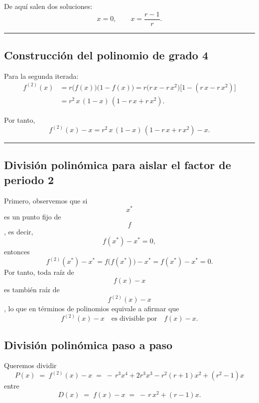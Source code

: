 \documentclass[
  11pt,
  a4paper,
  DIV=11,
  numbers=noendperiod]{scrreprt}
\begin{document}
De aquí salen dos soluciones:\\
\[
x = 0,
\qquad
x = \frac{r-1}{r}.
\]

\begin{center}\rule{0.5\linewidth}{0.5pt}\end{center}

\subsection{Construcción del polinomio de grado
4}\label{construcciuxf3n-del-polinomio-de-grado-4}

Para la segunda iterada:\\
\[
\begin{aligned}
f^{(2)}(x)
&= r\bigl(f(x)\bigr)\bigl(1 - f(x)\bigr)
= r\bigl(r\,x - r\,x^2\bigr)\bigl[1 - (r\,x - r\,x^2)\bigr]\\[6pt]
&= r^2\,x\,(1 - x)\,(1 - r\,x + r\,x^2).
\end{aligned}
\]

Por tanto,\\
\[
f^{(2)}(x) - x
= r^2\,x\,(1 - x)\,(1 - r\,x + r\,x^2) - x.
\]

\begin{center}\rule{0.5\linewidth}{0.5pt}\end{center}

\subsection{División polinómica para aislar el factor de periodo
2}\label{divisiuxf3n-polinuxf3mica-para-aislar-el-factor-de-periodo-2}

Primero, observemos que si \[x^*\] es un punto fijo de \[f\], es decir,
\[
f(x^*) - x^* = 0,
\] entonces \[
f^{(2)}(x^*) - x^* 
= f\bigl(f(x^*)\bigr) - x^* 
= f(x^*) - x^* 
= 0.
\] Por tanto, toda raíz de \[f(x)-x\] es también raíz de
\[f^{(2)}(x)-x\], lo que en términos de polinomios equivale a afirmar
que \[
f^{(2)}(x)-x
\quad\text{es divisible por}\quad
f(x)-x.
\]

\subsection*{División polinómica paso a paso}

Queremos dividir\\
\[
P(x) \;=\; f^{(2)}(x)-x 
         \;=\; -\,r^3x^4 + 2r^3x^3 - r^2(r+1)x^2 + (r^2-1)x
\] entre\\
\[
D(x) \;=\; f(x)-x 
         \;=\; -\,r\,x^2 + (r-1)x.
\]
\end{document}
